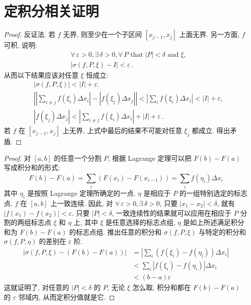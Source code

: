 \documentclass{book}
\newcommand{\Exists}{\exists\,}
\newcommand{\Any}{\forall\,}
\newcommand{\abs}[1]{\left\lvert #1 \right\rvert}
\numberwithin{equation}{section}
\numberwithin{figure}{section}
\theoremstyle{definition}
\begin{document}
\section{定积分相关证明}
\hypertarget{proof:IntegratableBoundary}{}
\begin{proof}
  反证法.
  若 $f$ 无界, 则至少在一个子区间 $[x_{j-1},x_j]$ 上面无界.
  另一方面, $f$ 可积, 说明:
  \begin{align*}
    &\Any\varepsilon>0,\Exists\delta>0,\Any P\text{ that }\abs{P}<\delta\text{ and }\xi,\\
    &\abs{\sigma(f,P,\xi)-I}<\varepsilon\,.
  \end{align*}
  从而以下结果应该对任意 $\xi$ 恒成立:
  \begin{align*}
    &\abs{\sigma(f,P,\xi)}<\abs{I}+\varepsilon.\\
    &\abs{\abs{\sum_{i\ne j}^{}f(\xi_i)\Delta x_i}-\abs{f(\xi_j)\Delta x_j}}<\abs{\sum_{i}^{}f(\xi_i)\Delta x_i}<\abs{I}+\varepsilon,\\
    &\abs{f(\xi_j)\Delta x_j}<\abs{\sum_{i\ne j}^{}f(\xi_i)\Delta x_i}+\abs{I}+\varepsilon\,.
  \end{align*}
  若 $f$ 在 $[x_{j-1},x_j]$ 上无界, 上式中最后的结果不可能对任意 $\xi_j$ 都成立. 得出矛盾.
\end{proof}
\hypertarget{proof:NewtonLeibnizFormula}{}
\begin{proof}
  对 $[a,b]$ 的任意一个分割 $P$, 根据 Lagrange 定理可以把 $F(b)-F(a)$ 写成积分和的形式:
  \begin{equation*}
    F(b)-F(a)=\sum_{i}^{} (F(x_i)-F(x_{i-1}))=\sum_{i}^{} f(\eta_i)\Delta x_i
  \end{equation*}
  其中 $\eta_i$ 是按照 Lagrange 定理所确定的一点. $\eta$ 是相应于 $P$ 的一组特别选定的标志点.
  $f$ 在 $[a,b]$ 上一致连续.
  因此, 对 $\Any \varepsilon>0,\Exists \delta>0$, 只要 $\abs{x_1-x_2}<\delta$, 就有 $\abs{f(x_1)-f(x_2)}<\varepsilon$.
  只要 $\abs{P}<\delta$, 一致连续性的结果就可以应用在相应于 $P$ 分割的两组标志点 $\xi$ 和 $\eta$ 上, 其中 $\xi$ 是任意选择的标志点组, $\eta$ 是如上所述满足积分和为 $F(b)-F(a)$ 的标志点组. 推出任意的积分和 $\sigma(f,P,\xi)$ 与特定的积分和 $\sigma(f,P,\eta)$ 的差别在 $\varepsilon$ 阶.
  \begin{align*}
    \abs{\sigma(f,P,\xi)-(F(b)-F(a))}&=\abs{\sum_{i}^{}(f(\xi_i)-f(\eta_i))\Delta x_i}\\
    &<\sum_{i}^{}\abs{f(\xi_i)-f(\eta_i)}\Delta x_i\\
    &<(b-a)\varepsilon
  \end{align*}
  这就证明了, 对任意的 $\abs{P}<\delta$ 的 $P$, 无论 $\xi$ 怎么取, 积分和都在 $F(b)-F(a)$ 的 $\varepsilon$ 邻域内, 从而定积分值就是它.
\end{proof}
\end{document}
